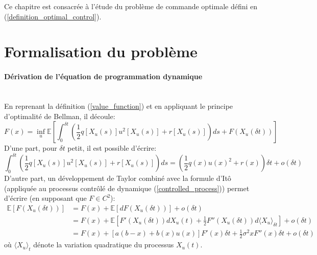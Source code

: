 \label{sec:Optimal_Control}
Ce chapitre est consacrée à l'étude du problème de commande optimale défini en (\ref{definition_optimal_control}).
\section{Formalisation du problème}
\paragraph{Dérivation de l'équation de programmation dynamique}\phantom{}\\
En reprenant la définition (\ref{value_function}) et en appliquant le principe d'optimalité de Bellman, il découle:
\begin{equation}\label{Bellman_optimality}
        F(x) = \inf_u\mathds{E}\left[\int_0^{\delta t}\left(\frac{1}{2}q\left[X_u(s)\right]u^2\left[X_u(s)\right]+r\left[X_u(s)\right]\right)ds+F(X_u(\delta t))\right]
\end{equation}
D'une part, pour $\delta t$ petit, il est possible d'écrire:
\begin{equation}\label{cost_function_simplification}
    \int_0^{\delta t}\left(\frac{1}{2}q\left[X_u(s)\right]u^2\left[X_u(s)\right]+r\left[X_u(s)\right]\right)ds=\left(\frac{1}{2}q(x){u(x)}^2+r(x)\right)\delta t+o(\delta t)
\end{equation}
D'autre part, un développement de Taylor combiné avec la formule d'Itô~\cite{ito1944} (appliquée au processus contrôlé de dynamique (\ref{controlled_process})) permet d'écrire (en supposant que $F\in C^2$):
\begin{equation}\label{taylor_ito}
    \begin{aligned}
        \mathds{E}[F(X_u(\delta t))]&=F(x)+\mathds{E}[dF(X_u(\delta t))]+o(\delta t)\\
        &=F(x)+\mathds{E}\left[F'(X_u(\delta t))dX_u(t)+\frac{1}{2}F''(X_u(\delta t))d{\langle X_u\rangle}_{\delta t} \right]+o(\delta t)\\
        &=F(x)+\left[a(b-x)+b(x)u(x)\right]F'(x)\delta t+\frac{1}{2}\sigma^2xF''(x)\delta t+o(\delta t)
    \end{aligned}
\end{equation}
où \({\langle X_u\rangle}_t\) dénote la variation quadratique du processus \(X_u(t)\).

